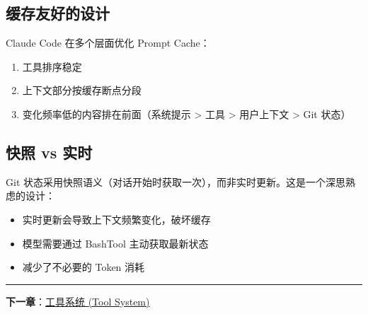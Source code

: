 \subsection{缓存友好的设计}

Claude Code 在多个层面优化 Prompt Cache：
\begin{enumerate}[nosep]
  \item 工具排序稳定
  \item 上下文部分按缓存断点分段
  \item 变化频率低的内容排在前面（系统提示 > 工具 > 用户上下文 > Git 状态）
\end{enumerate}

\subsection{快照 vs 实时}

Git 状态采用快照语义（对话开始时获取一次），而非实时更新。这是一个深思熟虑的设计：
\begin{itemize}[nosep]
  \item 实时更新会导致上下文频繁变化，破坏缓存
  \item 模型需要通过 BashTool 主动获取最新状态
  \item 减少了不必要的 Token 消耗
\end{itemize}

\bigskip\noindent\rule{\textwidth}{0.4pt}\bigskip

\textbf{下一章}：\href{./chapter-06-tool-system.md}{工具系统 (Tool System)}
